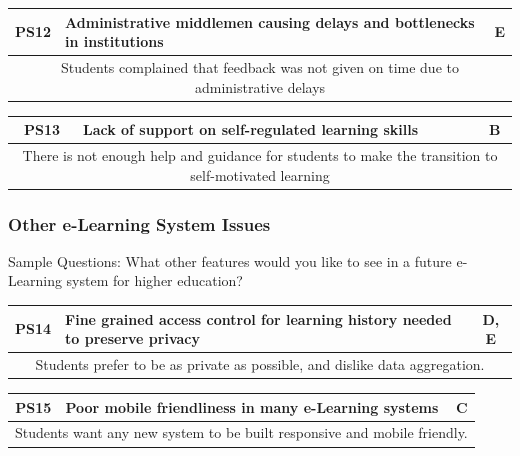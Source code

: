 \begin{table}[!ht]
	\begin{tabularx}{\textwidth}{|c|X|c|}
		\hline
		PS12 & \textbf{Administrative middlemen causing delays and bottlenecks in institutions} & E                \\
		\hline
		\multicolumn{3}{|X|}{Students complained that feedback was not given on time due to administrative delays} \\
		\hline
	\end{tabularx}
\end{table}

\begin{table}[!ht]
	\begin{tabularx}{\textwidth}{|c|X|c|}
		\hline
		PS13 & \textbf{Lack of support on self-regulated learning skills} & B                                                      \\
		\hline
		\multicolumn{3}{|X|}{There is not enough help and guidance for students to make the transition to self-motivated learning} \\
		\hline
	\end{tabularx}
\end{table}

\subsubsection{Other e-Learning System Issues}

Sample Questions: What other features would you like to see in a future e-Learning system for
higher education?

\begin{table}[!ht]
	\begin{tabularx}{\textwidth}{|c|X|c|}
		\hline
		PS14 & \textbf{Fine grained access control for learning history needed to preserve privacy} & D, E \\
		\hline
		\multicolumn{3}{|X|}{Students prefer to be as private as possible, and dislike data aggregation.}  \\
		\hline
	\end{tabularx}
\end{table}

\begin{table}[!ht]
	\begin{tabularx}{\textwidth}{|c|X|c|}
		\hline
		PS15 & \textbf{Poor mobile friendliness in many e-Learning systems} & C                        \\
		\hline
		\multicolumn{3}{|X|}{Students want any new system to be built responsive and mobile friendly.} \\
		\hline
	\end{tabularx}
\end{table}


